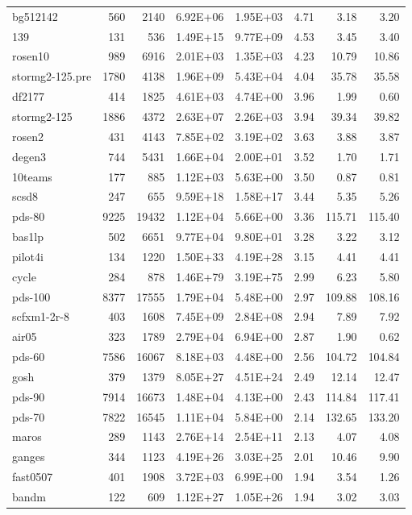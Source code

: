 \documentclass[10pt]{article}
\begin{document}
\begin{longtable}{|l|r|r|r|r|r|r|r|}
bg512142	&	560	&	2140	&	6.92E+06	&	1.95E+03	&	4.71	&	3.18	&	3.20	\\
139	&	131	&	536	&	1.49E+15	&	9.77E+09	&	4.53	&	3.45	&	3.40	\\
rosen10	&	989	&	6916	&	2.01E+03	&	1.35E+03	&	4.23	&	10.79	&	10.86	\\
stormg2-125.pre	&	1780	&	4138	&	1.96E+09	&	5.43E+04	&	4.04	&	35.78	&	35.58	\\
df2177	&	414	&	1825	&	4.61E+03	&	4.74E+00	&	3.96	&	1.99	&	0.60	\\
stormg2-125	&	1886	&	4372	&	2.63E+07	&	2.26E+03	&	3.94	&	39.34	&	39.82	\\
rosen2	&	431	&	4143	&	7.85E+02	&	3.19E+02	&	3.63	&	3.88	&	3.87	\\
degen3	&	744	&	5431	&	1.66E+04	&	2.00E+01	&	3.52	&	1.70	&	1.71	\\
10teams	&	177	&	885	&	1.12E+03	&	5.63E+00	&	3.50	&	0.87	&	0.81	\\
scsd8	&	247	&	655	&	9.59E+18	&	1.58E+17	&	3.44	&	5.35	&	5.26	\\
pds-80	&	9225	&	19432	&	1.12E+04	&	5.66E+00	&	3.36	&	115.71	&	115.40	\\
bas1lp	&	502	&	6651	&	9.77E+04	&	9.80E+01	&	3.28	&	3.22	&	3.12	\\
pilot4i	&	134	&	1220	&	1.50E+33	&	4.19E+28	&	3.15	&	4.41	&	4.41	\\
cycle	&	284	&	878	&	1.46E+79	&	3.19E+75	&	2.99	&	6.23	&	5.80	\\
pds-100	&	8377	&	17555	&	1.79E+04	&	5.48E+00	&	2.97	&	109.88	&	108.16	\\
scfxm1-2r-8	&	403	&	1608	&	7.45E+09	&	2.84E+08	&	2.94	&	7.89	&	7.92	\\
air05	&	323	&	1789	&	2.79E+04	&	6.94E+00	&	2.87	&	1.90	&	0.62	\\
pds-60	&	7586	&	16067	&	8.18E+03	&	4.48E+00	&	2.56	&	104.72	&	104.84	\\
gosh	&	379	&	1379	&	8.05E+27	&	4.51E+24	&	2.49	&	12.14	&	12.47	\\
pds-90	&	7914	&	16673	&	1.48E+04	&	4.13E+00	&	2.43	&	114.84	&	117.41	\\
pds-70	&	7822	&	16545	&	1.11E+04	&	5.84E+00	&	2.14	&	132.65	&	133.20	\\
maros	&	289	&	1143	&	2.76E+14	&	2.54E+11	&	2.13	&	4.07	&	4.08	\\
ganges	&	344	&	1123	&	4.19E+26	&	3.03E+25	&	2.01	&	10.46	&	9.90	\\
fast0507	&	401	&	1908	&	3.72E+03	&	6.99E+00	&	1.94	&	3.54	&	1.26	\\
bandm	&	122	&	609	&	1.12E+27	&	1.05E+26	&	1.94	&	3.02	&	3.03	\\

\end{longtable}
\end{document}
